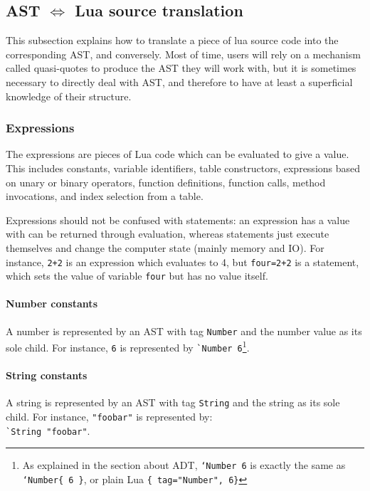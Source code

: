 \subsection{AST  $\Longleftrightarrow$ Lua source translation}

This subsection explains how to translate a piece of lua source code
into the corresponding AST, and conversely. Most of time, users will
rely on a mechanism called quasi-quotes to produce the AST they will
work with, but it is sometimes necessary to directly deal with AST,
and therefore to have at least a superficial knowledge of their
structure.

\subsubsection{Expressions}

The expressions are pieces of Lua code which can be evaluated to give a
value. This includes constants, variable identifiers, table
constructors, expressions based on unary or binary operators, function
definitions, function calls, method invocations, and index selection
from a table.

Expressions should not be confused with statements: an expression has
a value with can be returned through evaluation, whereas statements
just execute themselves and change the computer state (mainly memory
and IO). For instance, \verb|2+2| is an expression which evaluates to
4, but \verb|four=2+2| is a statement, which sets the value of
variable \verb|four| but has no value itself.

\paragraph{Number constants} 
A number is represented by an AST with tag \verb+Number+ and the
number value as its sole child. For instance, \verb+6+ is represented
by \verb+`Number 6+\footnote{As explained in the section about ADT,
  {\tt `Number 6} is exactly the same as {\tt `Number\{ 6 \}}, or
  plain Lua {\tt\{ tag="Number", 6\}} }.

\paragraph{String constants}
A string is represented by an AST with tag \verb+String+ and the
string as its sole child. For instance, \verb+"foobar"+ is
represented by:\\
\verb+`String "foobar"+.

